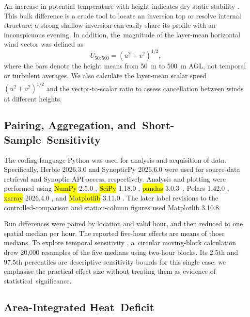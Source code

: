 \documentclass[air,article,accept,moreauthors]{Definitions/mdpi}
\begin{document}
An increase in potential temperature with height indicates dry static stability \citep{WallaceHobbs2006,Stull1988}.
This bulk difference is a crude tool to locate an inversion top or resolve internal structure: a strong shallow inversion can easily share its profile with an inconspicuous evening.
In addition, the~magnitude of the layer-mean horizontal wind vector was defined as
\begin{equation}
U_{50:500}=\left(\bar{u}^{2}+\bar{v}^{2}\right)^{1/2},
\end{equation}
where the bars denote the height means from 50~m to 500~m AGL, not temporal or turbulent averages.
We also calculate the layer-mean scalar speed $\overline{(u^{2}+v^{2})^{1/2}}$ and the vector-to-scalar ratio to assess cancellation between winds at different heights.

\subsection{Pairing, Aggregation, and~Short-Sample~Sensitivity}
\label{sec:v3-aggregation}

The coding language Python was used for analysis and acquisition of data. Specifically, Herbie 2026.3.0 \citep{Herbie} and SynopticPy 2026.6.0 \citep{SynopticPy} were used for source-data retrieval and Synoptic API access, respectively.
Analysis and plotting were performed using \hl{NumPy} 2.5.0 %
 \citep{Harris2020NumPy}, \hl{SciPy} 1.18.0 \citep{Virtanen2020SciPy}, \hl{pandas} 3.0.3~\citep{McKinney2010}, Polars 1.42.0 \citep{Polars}, \hl{xarray} 2026.4.0 \citep{HoyerHamman2017}, and \hl{Matplotlib} 3.11.0 \citep{Hunter2007Matplotlib}.
The later label revisions to the controlled-comparison and station-column figures used Matplotlib 3.10.8.

Run differences were paired by location and valid hour, and then reduced to one spatial median per hour.
The reported five-hour effects are means of those medians.
To explore temporal sensitivity \citep{Wilks2019}, a~circular moving-block calculation drew 20,000 resamples of the five medians using two-hour blocks.
Its 2.5th and 97.5th percentiles are descriptive sensitivity bounds for this single case; we emphasise the practical effect size without treating them as evidence of statistical~significance.

\subsection{Area-Integrated Heat~Deficit}
\label{sec:v3-heatdeficit-methods}
\end{document}
